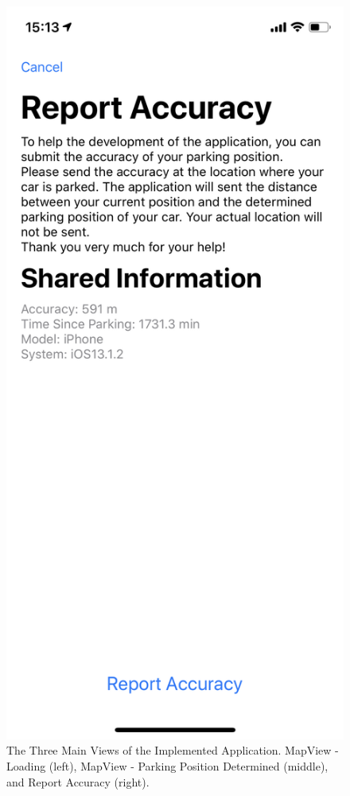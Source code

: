 \begin{figure}[h!]
\begin{minipage}{.33\textwidth}
  \includegraphics[width=.9\linewidth]{images/App/feedback.png}
\end{minipage}
\caption{The Three Main Views of the Implemented Application. MapView - Loading (left), MapView - Parking Position Determined (middle), and Report Accuracy (right).}
\label{fig:ui}
\end{figure}
\newpage

